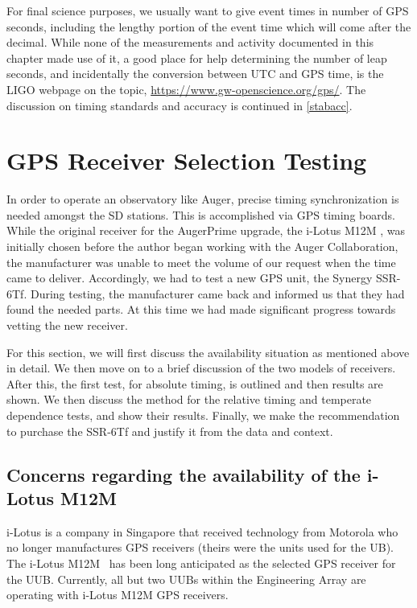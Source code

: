 For final science purposes, we usually want to give event times in number of GPS seconds, including the lengthy portion of the event time which will come after the decimal. While none of the measurements and activity documented in this chapter made use of it, a good place for help determining the number of leap seconds, and incidentally the conversion between UTC and GPS time, is the LIGO webpage on the topic, \url{https://www.gw-openscience.org/gps/}. The discussion on timing standards and accuracy is continued in \autoref{stabacc}.
\section{GPS Receiver Selection Testing} %
\label{gpstest}
In order to operate an observatory like Auger, precise timing synchronization is needed amongst the SD stations. This is accomplished via GPS timing boards. While the original receiver for the AugerPrime upgrade, the i-Lotus M12M \cite{m12mspec}, was initially chosen before the author began working with the Auger Collaboration, the manufacturer was unable to meet the volume of our request when the time came to deliver. Accordingly, we had to test a new GPS unit, the Synergy SSR-6Tf. During testing, the manufacturer came back and informed us that they had found the needed parts. At this time we had made significant progress towards vetting the new receiver. 

For this section, we will first discuss the availability situation as mentioned above in detail. We then move on to a brief discussion of the two models of receivers. After this, the first test, for absolute timing, is outlined and then results are shown. We then discuss the method for the relative timing and temperate dependence tests, and show their results. Finally, we make the recommendation to purchase the SSR-6Tf and justify it from the data and context.

\subsection{Concerns regarding the availability of the i-Lotus M12M}
i-Lotus is a company in Singapore that received technology from
Motorola who no longer manufactures GPS receivers (theirs were the units used for the UB). The i-Lotus
M12M~\cite{m12mspec} has been long anticipated as the selected GPS receiver for
the UUB. Currently, all but two UUBs within the Engineering Array
are operating with i-Lotus M12M GPS receivers.

